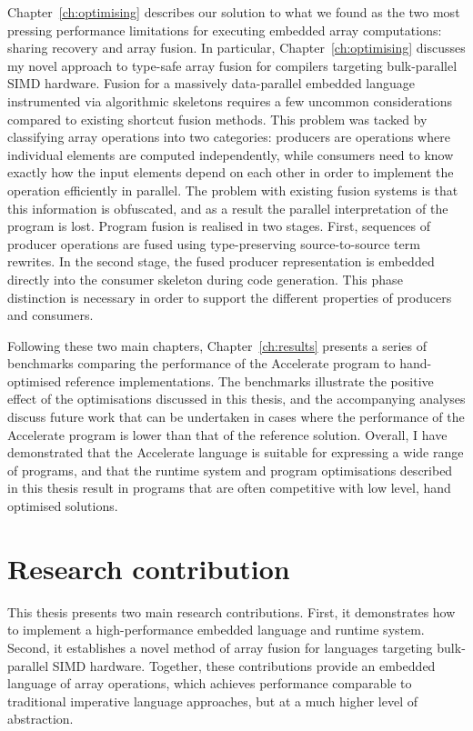 Chapter~\ref{ch:optimising} describes our solution to what we found as the two
most pressing performance limitations for executing embedded array computations:
sharing recovery and array fusion. In particular, Chapter~\ref{ch:optimising}
discusses my novel approach to type-safe array fusion for compilers targeting
bulk-parallel SIMD hardware. Fusion for a massively data-parallel embedded
language instrumented via algorithmic skeletons requires a few uncommon
considerations compared to existing shortcut fusion methods. This problem was
tacked by classifying array operations into two categories: producers are
operations where individual elements are computed independently, while consumers
need to know exactly how the input elements depend on each other in order to
implement the operation efficiently in parallel. The problem with existing
fusion systems is that this information is obfuscated, and as a result the
parallel interpretation of the program is lost. Program fusion is realised in
two stages. First, sequences of producer operations are fused using
type-preserving source-to-source term rewrites. In the second stage, the fused
producer representation is embedded directly into the consumer skeleton during
code generation. This phase distinction is necessary in order to support the
different properties of producers and consumers.

Following these two main chapters, Chapter~\ref{ch:results} presents a series of
benchmarks comparing the performance of the Accelerate program to hand-optimised
reference implementations. The benchmarks illustrate the positive effect of the
optimisations discussed in this thesis, and the accompanying analyses discuss
future work that can be undertaken in cases where the performance of the
Accelerate program is lower than that of the reference solution. Overall, I have
demonstrated that the Accelerate language is suitable for expressing a wide
range of programs, and that the runtime system and program optimisations
described in this thesis result in programs that are often competitive with low
level, hand optimised solutions.


\section{Research contribution}

This thesis presents two main research contributions. First, it demonstrates how
to implement a high-performance embedded language and runtime system. Second, it
establishes a novel method of array fusion for languages targeting bulk-parallel
SIMD hardware. Together, these contributions provide an embedded language of
array operations, which achieves performance comparable to traditional
imperative language approaches, but at a much higher level of abstraction.


